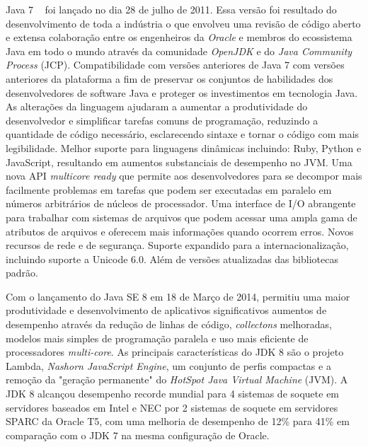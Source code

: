 Java 7 ~\cite{JSE7} foi lançado no dia 28 de julho de 2011. Essa versão foi resultado do desenvolvimento de toda a indústria o que envolveu uma revisão de código aberto e extensa colaboração entre os engenheiros da {\it Oracle} e membros do ecossistema Java em todo o mundo através da comunidade {\it OpenJDK} e do {\it Java Community Process} (\acs{JCP}). Compatibilidade com versões anteriores de Java 7 com versões anteriores da plataforma a fim de preservar os conjuntos de habilidades dos desenvolvedores de software Java e proteger os investimentos em tecnologia Java. As alterações da linguagem ajudaram a aumentar a produtividade do desenvolvedor e simplificar tarefas comuns de programação, reduzindo a quantidade de código necessário, esclarecendo sintaxe e tornar o código com mais legibilidade. Melhor suporte para linguagens dinâmicas incluindo: Ruby, Python e JavaScript, resultando em aumentos substanciais de desempenho no \acs{JVM}. Uma nova API {\it multicore ready} que permite aos desenvolvedores para se decompor mais facilmente problemas em tarefas que podem ser executadas em paralelo em números arbitrários de núcleos de processador. Uma interface de I/O abrangente para trabalhar com sistemas de arquivos que podem acessar uma ampla gama de atributos de arquivos e oferecem mais informações quando ocorrem erros. Novos recursos de rede e de segurança. Suporte expandido para a internacionalização, incluindo suporte a Unicode 6.0. Além de versões atualizadas das bibliotecas padrão.

Com o lançamento do Java SE 8 em 18 de Março de 2014, permitiu uma maior produtividade e desenvolvimento de aplicativos significativos aumentos de desempenho através da redução de linhas de código, {\it collectons} melhoradas, modelos mais simples de programação paralela e uso mais eficiente de processadores {\it multi-core}. As principais características do \acs{JDK} 8 são o projeto Lambda, {\it Nashorn JavaScript Engine}, um conjunto de perfis compactas e a remoção da "geração permanente" do {\it HotSpot Java Virtual Machine} (\acs{JVM}). A \acs{JDK} 8 alcançou desempenho recorde mundial para 4 sistemas de soquete em servidores baseados em Intel e NEC por 2 sistemas de soquete em servidores SPARC da Oracle T5, com uma melhoria de desempenho de 12\% para 41\% em comparação com o JDK 7 na mesma configuração de Oracle.

